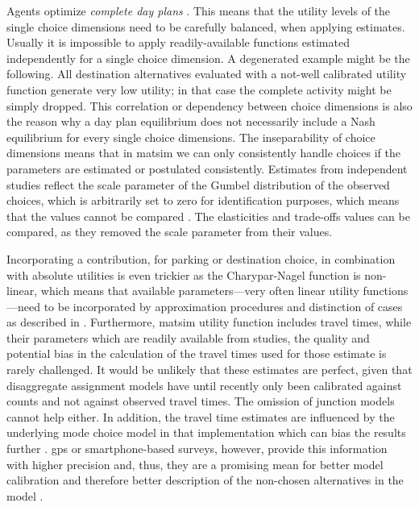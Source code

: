 %
Agents optimize \emph{complete day plans} \citep[see also][Section 6.3.1]{MATSim_Userguide_2015}. This means that the utility levels of the single choice dimensions need to be carefully balanced, when applying estimates. Usually it is impossible to apply readily-available functions estimated independently for a single choice dimension. A degenerated example might be the following. All destination alternatives evaluated with a not-well calibrated utility function generate very low utility; in that case the complete activity might be simply dropped. 
%
%
%
This correlation or dependency between choice dimensions is also the reason why a day plan equilibrium does not necessarily include a Nash equilibrium for every single choice dimensions. The inseparability of choice dimensions means that in \gls{matsim} we can only consistently handle choices if the parameters are estimated or postulated consistently. Estimates from independent studies reflect the scale parameter of the Gumbel distribution of the observed choices, which is arbitrarily set to zero for identification purposes, which means that the values cannot be compared . The elasticities and trade-offs values can be compared, as they removed the scale parameter from their values. 
%

Incorporating a contribution, \eg for parking or destination choice, in combination with absolute utilities is even trickier as the Charypar-Nagel function is non-linear, which means that available parameters---very often linear utility functions---need to be incorporated by approximation procedures and distinction of cases as described in \citet[][p.75ff]{Horni_PhDThesis_2013}. Furthermore, \gls{matsim} utility function includes travel times, while their parameters which are readily available from studies, the quality and potential bias in the calculation of the travel times used for those estimate is rarely challenged. It would be unlikely that these estimates are perfect, given that disaggregate assignment models have until recently only been calibrated against counts and not against observed travel times. The omission of junction models cannot help either. In addition, the travel time estimates are influenced by the underlying mode choice model in that implementation which can bias the results further \citep[][]{Vrtic_PhDThesis_2003}. 
\gls{gps} or smartphone-based surveys, however, provide this information with higher precision and, thus, they are a promising mean for better model calibration and therefore better description of the non-chosen alternatives in the model .

